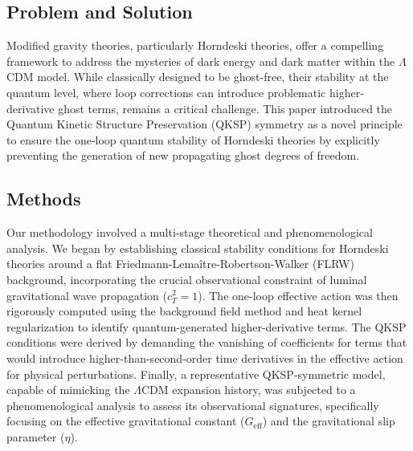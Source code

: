 \documentclass[twocolumn]{aastex631}
\begin{document}
\subsection{Problem and Solution}
Modified gravity theories, particularly Horndeski theories, offer a compelling framework to address the mysteries of dark energy and dark matter within the $\Lambda$CDM model. While classically designed to be ghost-free, their stability at the quantum level, where loop corrections can introduce problematic higher-derivative ghost terms, remains a critical challenge. This paper introduced the Quantum Kinetic Structure Preservation (QKSP) symmetry as a novel principle to ensure the one-loop quantum stability of Horndeski theories by explicitly preventing the generation of new propagating ghost degrees of freedom.

\subsection{Methods}
Our methodology involved a multi-stage theoretical and phenomenological analysis. We began by establishing classical stability conditions for Horndeski theories around a flat Friedmann-Lemaître-Robertson-Walker (FLRW) background, incorporating the crucial observational constraint of luminal gravitational wave propagation ($c_T^2=1$). The one-loop effective action was then rigorously computed using the background field method and heat kernel regularization to identify quantum-generated higher-derivative terms. The QKSP conditions were derived by demanding the vanishing of coefficients for terms that would introduce higher-than-second-order time derivatives in the effective action for physical perturbations. Finally, a representative QKSP-symmetric model, capable of mimicking the $\Lambda$CDM expansion history, was subjected to a phenomenological analysis to assess its observational signatures, specifically focusing on the effective gravitational constant ($G_{\text{eff}}$) and the gravitational slip parameter ($\eta$).
\end{document}
